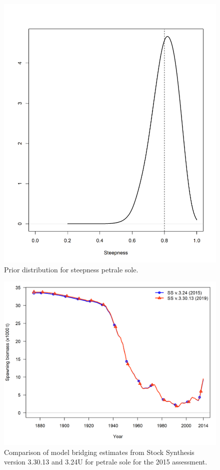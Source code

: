 \documentclass[12pt,]{article}
\begin{document}
\begin{figure}
\centering
\includegraphics{Figures/h_prior.png}
\caption{Prior distribution for steepness petrale sole.
\label{fig:h_prior}}
\end{figure}

\begin{figure}
\centering
\includegraphics{Figures/compare1_spawnbio.png}
\caption{Comparison of model bridging estimates from Stock Synthesis
version 3.30.13 and 3.24U for petrale sole for the 2015 assessment.
\label{fig:bridge}}
\end{figure}
\end{document}
